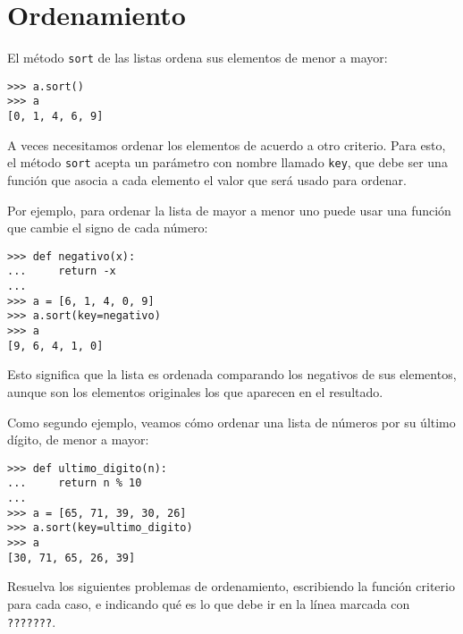 \section{Ordenamiento}

El método \lstinline!sort! de las listas ordena sus elementos de menor a
mayor:

\begin{lstlisting}
>>> a.sort()
>>> a
[0, 1, 4, 6, 9]
\end{lstlisting}

A veces necesitamos ordenar los elementos de acuerdo a otro criterio.
Para esto, el método \lstinline!sort! acepta un parámetro con nombre
llamado \lstinline!key!, que debe ser una función que asocia a cada
elemento el valor que será usado para ordenar.

Por ejemplo, para ordenar la lista de mayor a menor uno puede usar una
función que cambie el signo de cada número:

\begin{lstlisting}
>>> def negativo(x):
...     return -x
...
>>> a = [6, 1, 4, 0, 9]
>>> a.sort(key=negativo)
>>> a
[9, 6, 4, 1, 0]
\end{lstlisting}

Esto significa que la lista es ordenada comparando los negativos de sus
elementos, aunque son los elementos originales los que aparecen en el
resultado.

Como segundo ejemplo, veamos cómo ordenar una lista de números por su
último dígito, de menor a mayor:

\begin{lstlisting}
>>> def ultimo_digito(n):
...     return n % 10
...
>>> a = [65, 71, 39, 30, 26]
>>> a.sort(key=ultimo_digito)
>>> a
[30, 71, 65, 26, 39]
\end{lstlisting}

Resuelva los siguientes problemas de ordenamiento, escribiendo la
función criterio para cada caso, e indicando qué es lo que debe ir en la
línea marcada con \lstinline!???????!.

